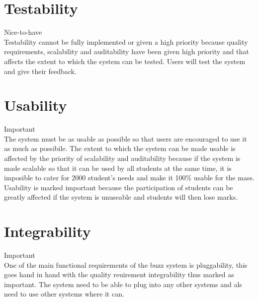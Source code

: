\documentclass[pdftex,10pt,a4paper]{report}
\begin{document}
\section{Testability}
Nice-to-have\\
Testability cannot be fully implemented or given a high priority because quality requirements, scalability and auditability have been given high priority and that affects the extent to which the system can be tested. Users will test the system and give their feedback.\\
\section{Usability}
Important\\ 
The system must be as usable as possible so that users are encouraged to use it as much as possibile. The extent to which the system can be made usable is affected by the priority of scalability and auditability because if the system is made scalable so that it can be used by all students at the same time, it is imposible to cater for 2000 student's needs and make it 100\% usable for the mass. Usability is marked important because the participation of students can be greatly affected if the system is unuseable and students will then lose marks.\\
\section{Integrability}
Important\\
One of the main functional requirements of the buzz system is pluggability, this goes hand in hand with the quality reuirement integrability thus marked as important. The system need to be able to plug into any other systems and als need to use other systems where it can.\\
\end{document}
